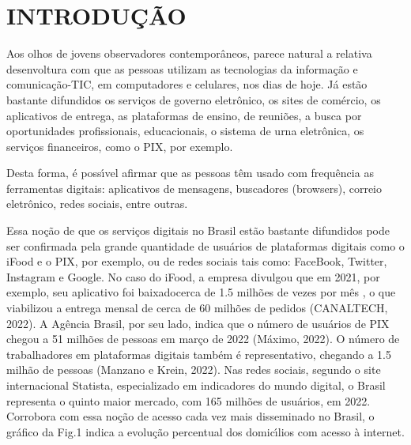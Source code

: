 \documentclass[
12pt,		%
openright,	%
twoside,  %
a4paper,			%
chapter=TITLE,		%
english,			%
french,				%
spanish,			%
brazil				%
]{USPSC-classe/USPSC}
\begin{document}
\chapter[INTRODU\c{C}\~AO]{INTRODU\c{C}\~AO}\label{INTRODU\c{C}\~AO}
Aos olhos de jovens observadores contempor\^aneos, parece natural a relativa desenvoltura com que as pessoas utilizam as tecnologias da informa\c{c}\~ao e comunica\c{c}\~ao-TIC, em computadores e celulares, nos dias de hoje. J\'a est\~ao bastante difundidos os servi\c{c}os de governo eletr\^onico, os sites de com\'ercio, os aplicativos de entrega, as plataformas de ensino, de reuni\~oes, a busca por oportunidades profissionais, educacionais, o sistema de urna eletr\^onica, os servi\c{c}os financeiros, como o PIX, por exemplo.









Desta forma, \'e poss\'{\i}vel afirmar que as pessoas t\^em usado com frequ\^encia  as ferramentas digitais: aplicativos de mensagens, buscadores (browsers), correio eletr\^onico, redes sociais, entre outras.









Essa no\c{c}\~ao de que os servi\c{c}os digitais no Brasil est\~ao bastante difundidos pode ser confirmada pela grande quantidade de usu\'arios de plataformas digitais como o iFood e o PIX, por exemplo, ou de redes sociais tais como: FaceBook, Twitter, Instagram e Google. No caso do iFood, a empresa divulgou que em 2021, por exemplo, seu aplicativo foi \textquotedbl baixado\textquotedbl  cerca de 1.5 milh\~oes de vezes por m\^es , o que viabilizou a entrega mensal de cerca de 60 milh\~oes de pedidos  (CANALTECH, 2022). A Ag\^encia Brasil, por seu lado, indica que o n\'umero de usu\'arios de PIX chegou a 51 milh\~oes de pessoas em mar\c{c}o de 2022 (M\'aximo, 2022). O n\'umero de trabalhadores em plataformas digitais tamb\'em \'e representativo, chegando a 1.5 milh\~ao de pessoas  (Manzano e Krein, 2022). Nas redes sociais, segundo o site internacional Statista, especializado em indicadores do mundo digital, o Brasil representa o quinto maior mercado, com 165 milh\~oes de usu\'arios, em 2022. Corrobora com essa no\c{c}\~ao de acesso cada vez mais disseminado no Brasil, o gr\'afico da Fig.1 indica a evolu\c{c}\~ao percentual dos domic\'{\i}lios com acesso \`a internet.
\end{document}
